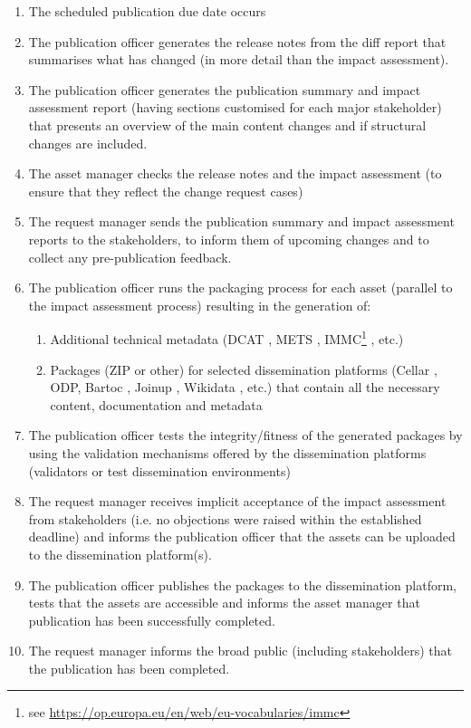 	\begin{enumerate}
		\item The scheduled publication due date occurs
		\item The publication officer generates the release notes from the diff report that summarises what has changed (in more detail than the impact assessment).
		\item The publication officer generates the publication summary and impact assessment report (having sections customised for each major stakeholder) that presents an overview of the main content changes and if structural changes are included. 
		\item The asset manager checks the release notes and the impact assessment (to ensure that they reflect the change request cases)
		\item The request manager sends the publication summary and impact assessment reports to the stakeholders, to inform them of upcoming changes and to collect any pre-publication feedback.
		\item The publication officer runs the packaging process for each asset (parallel to the impact assessment process) resulting in the generation of: 
		\begin{enumerate}
			\item Additional technical metadata (DCAT \citep{dcat2}, METS \citep{mets}, IMMC\footnote{see \url{https://op.europa.eu/en/web/eu-vocabularies/immc}} , etc.)
			\item Packages (ZIP or other) for selected dissemination platforms (Cellar \citep{cdm-francesconi2015ontology}, ODP, Bartoc \citep{ledl2016describing}, Joinup \citep{hillenius2013free}, Wikidata \citep{vrandevcic2014wikidata}, etc.) that contain all the necessary content, documentation and metadata
		\end{enumerate}
		\item The publication officer tests the integrity/fitness of the generated packages by using the validation mechanisms offered by the dissemination platforms (validators or test dissemination environments)
		\item The request manager receives implicit acceptance of the impact assessment from stakeholders (i.e. no objections were raised within the established deadline) and informs the publication officer that the assets can be uploaded to the dissemination platform(s). 
		\item The publication officer publishes the packages to the dissemination platform, tests that the assets are accessible and informs the asset manager that publication has been successfully completed.
		\item The request manager informs the broad public (including stakeholders) that the publication has been completed.
		
	\end{enumerate}
	
